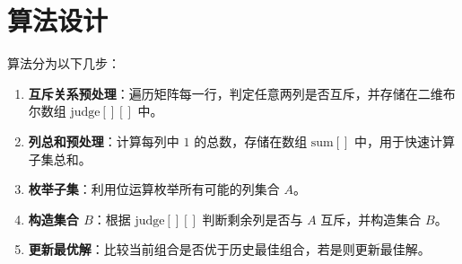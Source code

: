 \documentclass[UTF8]{ctexart}
\begin{document}
\section{算法设计}
算法分为以下几步：
\begin{enumerate}
    \item \textbf{互斥关系预处理}：遍历矩阵每一行，判定任意两列是否互斥，并存储在二维布尔数组 $\text{judge}[][]$ 中。
    \item \textbf{列总和预处理}：计算每列中 $1$ 的总数，存储在数组 $\text{sum}[]$ 中，用于快速计算子集总和。
    \item \textbf{枚举子集}：利用位运算枚举所有可能的列集合 $A$。
    \item \textbf{构造集合 $B$}：根据 $\text{judge}[][]$ 判断剩余列是否与 $A$ 互斥，并构造集合 $B$。
    \item \textbf{更新最优解}：比较当前组合是否优于历史最佳组合，若是则更新最佳解。
\end{enumerate}
\end{document}

